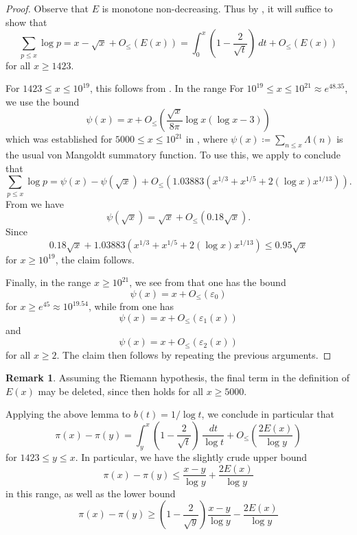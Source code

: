 \documentclass[12pt,a4paper,reqno]{amsart}
\numberwithin{equation}{section}
\theoremstyle{plain}
\theoremstyle{definition}
\newtheorem{remark}[theorem]{Remark}
\newcommand\eps{\varepsilon}
\begin{document}
\begin{proof} Observe that $E$ is monotone non-decreasing. Thus by , it will suffice to show that
$$ \sum_{p \leq x} \log p = x - \sqrt{x} + O_{\leq}(E(x))
  = \int_0^x \left(1-\frac{2}{\sqrt{t}}\right)\ dt + O_{\leq}(E(x))$$
for all $x \geq 1423$.

For $1423 \leq x \leq 10^{19}$, this follows from \cite[Theorem 2]{buthe-2}.  In the range
For $10^{19} \leq x \leq 10^{21} \approx e^{48.35}$, we use the bound
  $$ \psi(x) = x + O_{\leq}\left(\frac{\sqrt{x}}{8\pi} \log x(\log x - 3)\right)
$$
which was established for $5000 \leq x \leq 10^{21}$ in \cite[(7.3)]{buthe}, where $\psi(x) \coloneqq \sum_{n \leq x} \Lambda(n)$ is the usual von Mangoldt summatory function.  To use this, we apply \cite[(6.10), (6.11)]{buthe} to conclude that
$$
\sum_{p \leq x} \log p = \psi(x) - \psi(\sqrt{x}) + O_{\leq}(1.03883 (x^{1/3} + x^{1/5} + 2 (\log x) x^{1/13})).$$
From \cite[Theorems 10,12]{rs} we have
$$ \psi(\sqrt{x}) = \sqrt{x} + O_{\leq}(0.18 \sqrt{x}).$$
Since
$$ 0.18 \sqrt{x} + 1.03883 (x^{1/3} + x^{1/5} + 2 (\log x) x^{1/13}) \leq 0.95 \sqrt{x}$$
for $x \geq 10^{19}$, the claim follows.

Finally, in the range $x \geq 10^{21}$, we see from \cite[Theorem 1, Table 1]{buthe} that one has the bound
$$ \psi(x) = x + O_{\leq}(\eps_0)$$
for $x \geq e^{45} \approx 10^{19.54}$, while from \cite[Theorems 1.1, 1.4]{johnston-yang} one has
$$ \psi(x) = x + O_{\leq}(\eps_1(x))$$
and
$$ \psi(x) = x + O_{\leq}(\eps_2(x))$$
for all $x \geq 2$.  The claim then follows by repeating the previous arguments.
\end{proof}
    
\begin{remark} Assuming the Riemann hypothesis, the final term in the definition of $E(x)$ may be deleted, since \cite[(7.3)]{buthe} then holds for all $x \geq 5000$.  
\end{remark}

Applying the above lemma to $b(t) = 1/\log t$, we conclude in particular that
\begin{equation}\label{pi-est} \pi(x) - \pi(y) = \int_y^x(1 - \frac{2}{\sqrt{t}}) \ \frac{dt}{\log t}
+ O_\leq(\frac{2 E(x)}{\log y})
\end{equation}
for $1423 \leq y \leq x$. In particular, we have the slightly crude upper bound
\begin{equation}\label{pixy-upper} \pi(x) - \pi(y) \leq \frac{x-y}{\log y} + \frac{2 E(x)}{\log y}
\end{equation}
in this range, as well as the lower bound
\begin{equation}\label{pixy-lower} \pi(x) - \pi(y) \geq \left(1-\frac{2}{\sqrt{y}}\right)\frac{x-y}{\log y} - \frac{2 E(x)}{\log y}
\end{equation}
\end{document}
